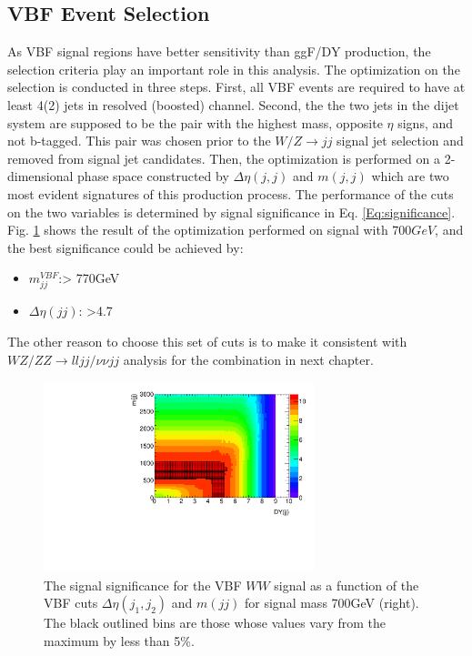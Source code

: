 \subsection{VBF Event Selection}
As VBF signal regions have better sensitivity than ggF/DY production, the selection criteria play an important role in this analysis. The optimization on the selection is conducted in three steps. First, all VBF events are required to have at least 4(2) jets in resolved (boosted) channel. Second, the the two jets in the dijet system are supposed to be the pair with the highest mass, opposite $\eta$ signs, and not b-tagged. This pair was chosen prior to the $W/Z\rightarrow jj$ signal jet selection and removed from signal jet candidates. Then, the optimization is performed on a 2-dimensional phase space constructed by $\Delta\eta(j,j)$ and $m(j,j)$ which are two most evident signatures of this production process. The performance of the cuts on the two variables is determined by signal significance in Eq. \ref{Eq:significance}. Fig. \ref{Fig:VBFOptimization} shows the result of the optimization performed on signal with $700GeV$, and the best significance could be achieved by:
\begin{itemize}
	\item {\bf $m_{jj}^{VBF}$}:> 770GeV
	\item {\bf $\Delta\eta(jj)$}: >4.7
\end{itemize}
The other reason to choose this set of cuts is to make it consistent with $WZ/ZZ \rightarrow lljj/\nu\nu jj$ analysis for the combination in next chapter. 
\begin{figure}[h]
	\centering
	\includegraphics[width=0.7\textwidth]{Chapter3/VBF700_SignfSpace}
	\caption{The signal significance for the VBF $WW$ signal as a function of the VBF cuts $\Delta \eta(j_1,j_2)$ and $m(jj)$ for signal mass 700GeV (right). The black outlined bins are those whose values vary from the maximum by less than 5\%.}
	\label{Fig:VBFOptimization}
\end{figure}
